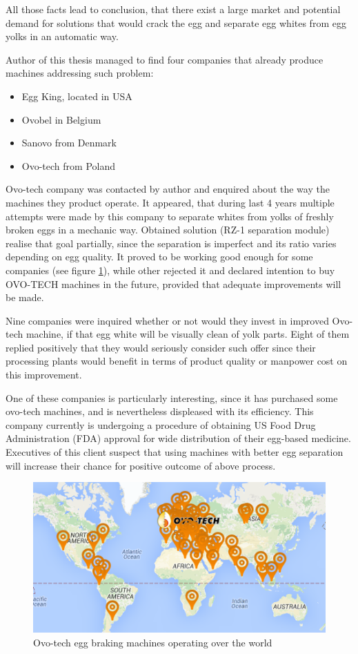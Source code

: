 \documentclass[12pt,twoside,a4paper]{article}
\begin{document}
All those facts lead to conclusion, that there exist a large market and potential demand for solutions that would crack the egg and separate egg whites from egg yolks in an automatic way.

Author of this thesis managed to find four companies that already produce machines addressing such problem:
\begin{itemize}
\item Egg King, located in USA
\item Ovobel in Belgium
\item Sanovo from Denmark
\item Ovo-tech from Poland
\end{itemize}
Ovo-tech company was contacted by author and enquired about the way the machines they product operate. 
It appeared, that during last 4 years multiple attempts were made by this company to separate whites from yolks of freshly broken eggs in a mechanic way.
Obtained solution (RZ-1 separation module) realise that goal partially, since the separation is imperfect and its ratio varies depending on egg quality.
It proved to be working good enough for some companies (see figure \ref{fig:map}), while other rejected it and declared intention to buy OVO-TECH machines in the future, provided that adequate improvements will be made.

Nine companies were inquired whether or not would they invest in improved Ovo-tech machine, if that egg white will be visually clean of yolk parts.
Eight of them replied positively that they would seriously consider such offer since their processing plants would benefit in terms of product quality or manpower cost on this improvement.

One of these companies is particularly interesting, since it has purchased some ovo-tech machines, and is nevertheless displeased with its efficiency.
This company currently is undergoing a procedure of obtaining US Food Drug Administration (FDA) approval for wide distribution of their egg-based medicine.
Executives of this client suspect that using machines with better egg separation will increase their chance for positive outcome of above process.

\begin{figure}[H]
\centering
\includegraphics[width=0.4\paperwidth]{map}
\caption{Ovo-tech egg braking machines operating over the world}\label{fig:map}
\end{figure}
\end{document}
